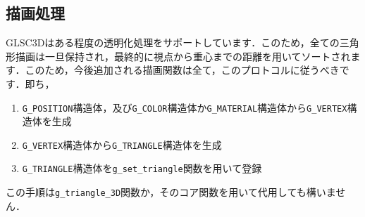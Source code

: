 \documentclass[platex,a4paper,12pt]{jsarticle}%
\begin{document}
\subsection{描画処理}
GLSC3Dはある程度の透明化処理をサポートしています．このため，全ての三角形描画は一旦保持され，最終的に視点から重心までの距離を用いてソートされます．このため，今後追加される描画関数は全て，このプロトコルに従うべきです．即ち，

\begin{enumerate}
 \item \verb|G_POSITION|構造体，及び\verb|G_COLOR|構造体か\verb|G_MATERIAL|構造体から\verb|G_VERTEX|構造体を生成
 \item \verb|G_VERTEX|構造体から\verb|G_TRIANGLE|構造体を生成
 \item \verb|G_TRIANGLE|構造体を\verb|g_set_triangle|関数を用いて登録
\end{enumerate}

この手順は\verb|g_triangle_3D|関数か，そのコア関数を用いて代用しても構いません．
\end{document}
